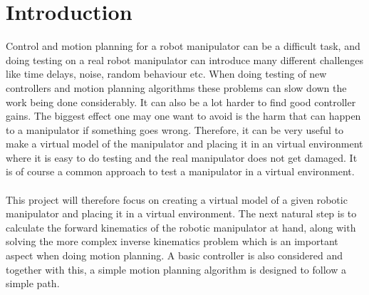 \chapter{Introduction}

Control and motion planning for a robot manipulator can be a difficult task, and doing testing on a real robot manipulator can introduce many different challenges like time delays, noise, random behaviour etc. When doing testing of new controllers and motion planning algorithms these problems can slow down the work being done considerably. It can also be a lot harder to find good controller gains. The biggest effect one may one want to avoid is the harm that can happen to a manipulator if something goes wrong. Therefore, it can be very useful to make a virtual model of the manipulator and placing it in an virtual environment where it is easy to do testing and the real manipulator does not get damaged. It is of course a common approach to test a manipulator in a virtual environment.\\\\
This project will therefore focus on creating a virtual model of a given robotic manipulator and placing it in a virtual environment. The next natural step is to calculate the forward kinematics of the robotic manipulator at hand, along with solving the more complex inverse kinematics problem which is an important aspect when doing motion planning. A basic controller is also considered and together with this, a simple motion planning algorithm is designed to follow a simple path.
    






